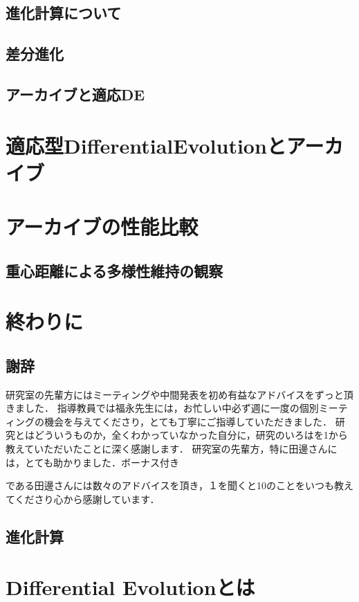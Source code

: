 \documentclass[a4paper,11pt,oneside,openany]{jsbook}
\begin{document}
\section{進化計算について}
\section{差分進化}
\section{アーカイブと適応DE}
\chapter{適応型DifferentialEvolutionとアーカイブ}
\chapter{アーカイブの性能比較}
\section{重心距離による多様性維持の観察}
\section{}

\chapter{終わりに}
\section{謝辞}
研究室の先輩方にはミーティングや中間発表を初め有益なアドバイスをずっと頂きました．
指導教員では福永先生には，お忙しい中必ず週に一度の個別ミーティングの機会を与えてくださり，とても丁寧にご指導していただきました．
研究とはどういうものか，全くわかっていなかった自分に，研究のいろはを1から教えていただいたことに深く感謝します．
研究室の先輩方，特に田邊さんには，とても助かりました．ボーナス付き

である田邊さんには数々のアドバイスを頂き，１を聞くと10のことをいつも教えてくださり心から感謝しています．

\section{進化計算}



\chapter{Differential Evolutionとは}
\end{document}
